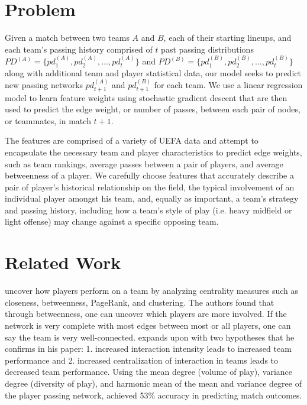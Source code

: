 \documentclass[11pt,letterpaper]{article}
\begin{document}
\section{Problem}
Given a match between two teams $A$ and $B$, each of their starting lineups, and each team's passing history comprised of $t$ past passing distributions $PD^{(A)} = \{pd^{(A)}_1, pd^{(A)}_2,…,pd^{(A)}_t\}$ and $PD^{(B)} = \{pd^{(B)}_1, pd^{(B)}_2,…,pd^{(B)}_t\}$ along with additional team and player statistical data, our model seeks to predict new passing networks $pd^{(A)}_{t+1}$ and $pd^{(B)}_{t+1}$ for each team.  We use a linear regression model to learn feature weights using stochastic gradient descent that are then used to predict the edge weight, or number of passes, between each pair of nodes, or teammates, in match $t+1$. 

The features are comprised of a variety of UEFA data and attempt to encapsulate the necessary team and player characteristics to predict edge weights, such as team rankings, average passes between a pair of players, and average betweenness of  a player. We carefully choose features that accurately describe a pair of player's historical relationship on the field, the typical involvement of an individual player amongst his team, and, equally as important, a team's strategy and passing history, including how a team's style of play (i.e. heavy midfield or light offense) may change against a specific opposing team.  

\section{Related Work}

\cite{Pena:12} uncover how players perform on a team by analyzing centrality measures such as closeness, betweenness, PageRank, and clustering. The authors found that through betweenness, one can uncover which players are more involved. If the network is very complete with most edges between most or all players, one can say the team is very well-connected. \cite{Grund:12} expands upon \cite{Pena:12} with two hypotheses that he confirms in his paper: 1. increased interaction intensity leads to increased team performance and 2. increased centralization of interaction in teams leads to decreased team performance. Using the mean degree (volume of play), variance degree (diversity of play), and harmonic mean of the mean and variance degree of the player passing network, \cite{Cintia:15} achieved 53\% accuracy in predicting match outcomes.
\end{document}
